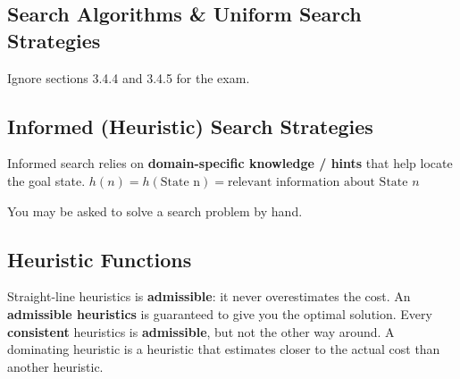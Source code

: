 \documentclass[exam={Midterm},color=true]{cs581exam}
\renewcommand{\emph}[1]{\textbf{#1}}
\begin{document}
\subsection{Search Algorithms \& Uniform Search Strategies}\label{subsec:3.3-4}

Ignore sections 3.4.4 and 3.4.5 for the exam.
\setcounter{subsection}{4}%
\subsection{Informed (Heuristic) Search Strategies}\label{subsec:3.5}
Informed search relies on \emph{domain-specific knowledge / hints} that help locate the goal state.
$h(n)=h(\mbox{State n})=\mbox{relevant information about State } n$

You may be asked to solve a search problem by hand.
\subsection{Heuristic Functions}\label{subsec:3.6}
Straight-line heuristics is \emph{admissible}: it never overestimates the cost.
An \emph{admissible heuristics} is guaranteed to give you the optimal solution.
Every \emph{consistent} heuristics is \emph{admissible}, but not the other way around.
A dominating heuristic is a heuristic that estimates closer to the actual cost than another heuristic.
\end{document}
